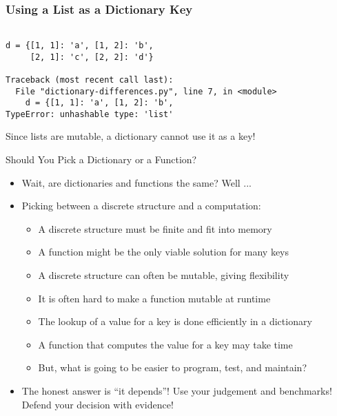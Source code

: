 \documentclass[14pt,aspectratio=169]{beamer}
\begin{document}
%
\begin{frame}[fragile]
  \frametitle{Using a List as a Dictionary Key}
  \begin{minipage}{6in}
    \vspace*{.25in}
    \begin{verbatim}

d = {[1, 1]: 'a', [1, 2]: 'b',
     [2, 1]: 'c', [2, 2]: 'd'}

Traceback (most recent call last):
  File "dictionary-differences.py", line 7, in <module>
    d = {[1, 1]: 'a', [1, 2]: 'b',
TypeError: unhashable type: 'list'

    \end{verbatim}
  \end{minipage}
  \vspace*{.025in}
  \begin{center}
    \normalsize \noindent Since lists are mutable, a dictionary cannot use it as
    a key! \\
  \end{center}
\end{frame}

%
\begin{frame}{Should You Pick a Dictionary or a Function?}
  \begin{itemize}
    \item Wait, are dictionaries and functions the same? Well ...
      \vspace*{-.15in}
    \item Picking between a discrete structure and a computation:
      \begin{itemize}
        \item A discrete structure must be finite and fit into memory
        \item A function might be the only viable solution for many keys
        \item A discrete structure can often be mutable, giving flexibility
        \item It is often hard to make a function mutable at runtime
        \item The lookup of a value for a key is done efficiently in a
          dictionary
        \item A function that computes the value for a key may take time
        \item But, what is going to be easier to program, test, and maintain?
      \end{itemize}
      \vspace*{-.2in}
    \item The honest answer is ``it depends''! Use your judgement and
      benchmarks! Defend your decision with evidence!
  \end{itemize}
\end{frame}
\end{document}
